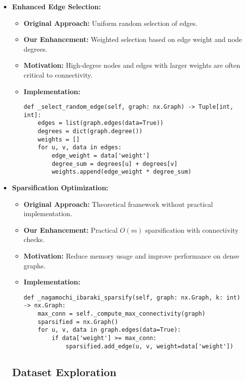 \documentclass[11pt]{article}
\begin{document}
\begin{itemize}
    \item \textbf{Enhanced Edge Selection:}
    \begin{itemize}
        \item \textbf{Original Approach:} Uniform random selection of edges.
        \item \textbf{Our Enhancement:} Weighted selection based on edge weight and node degrees.
        \item \textbf{Motivation:} High-degree nodes and edges with larger weights are often critical to connectivity.
        \item \textbf{Implementation:}
        \begin{verbatim}
def _select_random_edge(self, graph: nx.Graph) -> Tuple[int, int]:
    edges = list(graph.edges(data=True))
    degrees = dict(graph.degree())
    weights = []
    for u, v, data in edges:
        edge_weight = data['weight']
        degree_sum = degrees[u] + degrees[v]
        weights.append(edge_weight * degree_sum)
        \end{verbatim}
    \end{itemize}

    \item \textbf{Sparsification Optimization:}
    \begin{itemize}
        \item \textbf{Original Approach:} Theoretical framework without practical implementation.
        \item \textbf{Our Enhancement:} Practical \( O(m) \) sparsification with connectivity checks.
        \item \textbf{Motivation:} Reduce memory usage and improve performance on dense graphs.
        \item \textbf{Implementation:}
        \begin{verbatim}
def _nagamochi_ibaraki_sparsify(self, graph: nx.Graph, k: int) -> nx.Graph:
    max_conn = self._compute_max_connectivity(graph)
    sparsified = nx.Graph()
    for u, v, data in graph.edges(data=True):
        if data['weight'] >= max_conn:
            sparsified.add_edge(u, v, weight=data['weight'])
        \end{verbatim}
    \end{itemize}


\subsection{Dataset Exploration}


\end{itemize}
\end{document}
